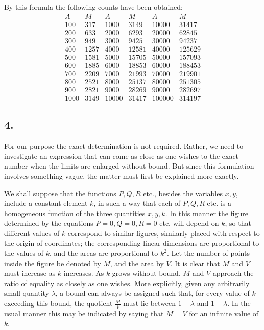 \documentclass[12pt]{article}
\begin{document}
By this formula the following counts have been obtained:
\[
\begin{array}{rr|rr|rr}
A&M&A&M&A&M\\
100&317&1000&3149&10000&31417\\
200&633&2000&6293&20000&62845\\
300&949&3000&9425&30000&94237\\
400&1257&4000&12581&40000&125629\\
500&1581&5000&15705&50000&157093\\
600&1885&6000&18853&60000&188453\\
700&2209&7000&21993&70000&219901\\
800&2521&8000&25137&80000&251305\\
900&2821&9000&28269&90000&282697\\
1000&3149&10000&31417&100000&314197
\end{array}
\]

\subsection*{4.}

For our purpose the exact determination is not required. Rather, we need to investigate an expression that can come as close as one wishes to the exact number when the limits are enlarged without bound. But since this formulation involves something vague, the matter must first be explained more exactly.

We shall suppose that the functions $P,Q,R$ etc., besides the variables $x,y$, include a constant element $k$, in such a way that each of $P,Q,R$ etc. is a homogeneous function of the three quantities $x,y,k$. In this manner the figure determined by the equations $P=0,Q=0,R=0$ etc. will depend on $k$, so that different values of $k$ correspond to similar figures, similarly placed with respect to the origin of coordinates; the corresponding linear dimensions are proportional to the values of $k$, and the areas are proportional to $k^2$. Let the number of points inside the figure be denoted by $M$, and the area by $V$. It is clear that $M$ and $V$ must increase as $k$ increases. As $k$ grows without bound, $M$ and $V$ approach the ratio of equality as closely as one wishes. More explicitly, given any arbitrarily small quantity $\lambda$, a bound can always be assigned such that, for every value of $k$ exceeding this bound, the quotient $\frac{M}{V}$ must lie between $1-\lambda$ and $1+\lambda$. In the usual manner this may be indicated by saying that $M=V$ for an infinite value of $k$.
\end{document}
